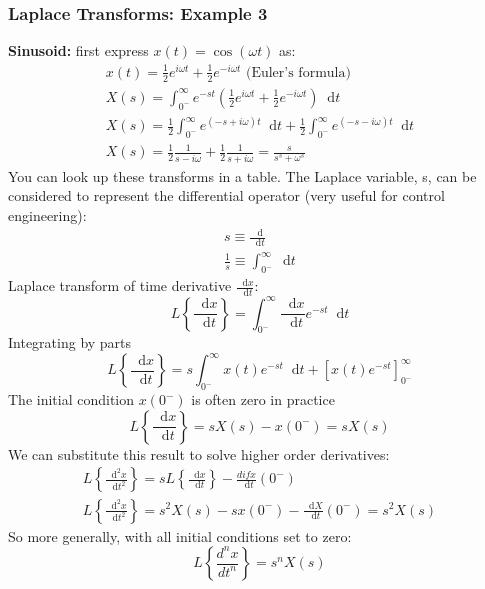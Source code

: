 \documentclass[class=report, crop=false, 12pt,a4paper, tikz, border=4mm]{standalone}
\newcommand{\dif}{\mathop{}\!\mathrm{d}}
\begin{document}
\subsubsection{Laplace Transforms: Example 3}
\textbf{Sinusoid:} first express $x(t) = \cos{(\omega t)}$ as:
\begin{gather}
  x(t) = \frac{1}{2} e^{i \omega t} + \frac{1}{2} e^{-i \omega t} \textrm{ (Euler's formula)}\\
  X(s) = \int_{0^-}^\infty e^{-st} \left( \frac{1}{2} e^{i \omega t} + \frac{1}{2} e^{-i \omega t} \right) \dif t\\
  X(s) = \frac{1}{2} \int_{0^-}^\infty e^{(-s + i \omega)t}\dif t + \frac{1}{2} \int_{0^-}^\infty e^{(-s - i \omega)t} \dif t\\
  X(s) = \frac{1}{2} \frac{1}{s - i \omega} + \frac{1}{2} \frac{1}{s + i \omega} = \frac{s}{s^s + \omega^s} 
\end{gather}
You can look up these transforms in a table. The Laplace variable, s, can be considered to represent the differential operator (very useful for control engineering):
\begin{gather}
  s \equiv \frac{\dif}{\dif t}\\
  \frac{1}{s} \equiv \int_{0^-}^\infty \dif t
\end{gather}
Laplace transform of time derivative $\frac{\dif x}{\dif t}$:
\begin{equation}
  L \left\{ \frac{\dif x}{\dif t} \right\} = \int_{0^-}^\infty \frac{\dif x}{\dif t} e^{-st} \dif t
\end{equation}
Integrating by parts
\begin{equation}
  L \left\{ \frac{\dif x}{\dif t} \right\} = s \int_{0^-}^\infty x(t) e^{-st} \dif t + \left[ x(t)e^{-st} \right]_{0^-}^\infty
\end{equation}
The initial condition $x(0^-)$ is often zero in practice
\begin{equation}
  L \left\{ \frac{\dif x}{\dif t} \right\} = sX(s) - x(0^-) = sX(s)
\end{equation}
We can substitute this result to solve higher order derivatives:
\begin{gather}
  L\left\{ \frac{\dif^2 x}{\dif t^2} \right\} = sL\left\{ \frac{\dif x}{\dif t} \right\} - \frac{dif x}{\dif t} (0^-)\\
  L\left\{ \frac{\dif^2 x}{\dif t^2} \right\} = s^2 X(s) - sx(0^-) - \frac{\dif X}{\dif t} (0^-) = s^2 X(s)
\end{gather}
So more generally, with all initial conditions set to zero:
\begin{equation}
  L\left\{ \frac{d^n x}{dt^n} \right\} = s^n X(s)
\end{equation}
\end{document}
